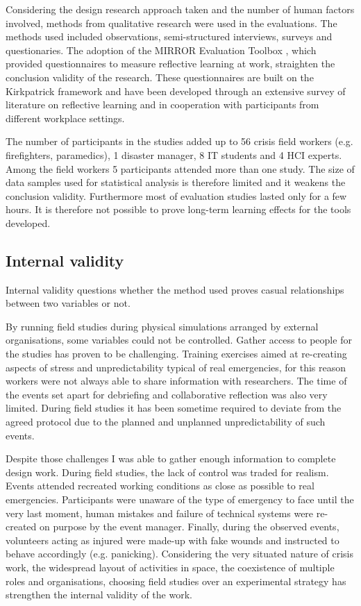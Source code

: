Considering the design research approach taken and the number of human factors involved, methods from qualitative research were used in the evaluations. The methods used included observations, semi-structured interviews, surveys and questionaries. The adoption of the MIRROR Evaluation Toolbox \autocite{Renner:v4nLmwOk}, which provided questionnaires to measure reflective learning at work, straighten the conclusion validity of the research. These questionnaires are built on the Kirkpatrick framework \autocite{kirkpatrick2009evaluating} and have been developed through an extensive survey of literature on reflective learning and in cooperation with participants from different workplace settings.

The number of participants in the studies added up to 56 crisis field workers (e.g. firefighters, paramedics), 1 disaster manager, 8 IT students and 4 HCI experts. Among the field workers 5 participants attended more than one study. The size of data samples used for statistical analysis is therefore limited and it weakens the conclusion validity. Furthermore most of evaluation studies lasted only for a few hours. It is therefore not possible to prove long-term learning effects for the tools developed.

\subsection{Internal validity}\label{internal-validity}

Internal validity questions whether the method used proves casual relationships between two variables or not.

By running field studies during physical simulations arranged by external organisations, some variables could not be controlled. Gather access to people for the studies has proven to be challenging. Training exercises aimed at re-creating aspects of stress and unpredictability typical of real emergencies, for this reason workers were not always able to share information with researchers. The time of the events set apart for debriefing and collaborative reflection was also very limited. During field studies it has been sometime required to deviate from the agreed protocol due to the planned and unplanned unpredictability of such events.

Despite those challenges I was able to gather enough information to complete  design work. During field studies, the lack of control was traded for realism. Events attended recreated working conditions as close as possible to real emergencies. Participants were unaware of the type of emergency to face until the very last moment, human mistakes and failure of technical systems were re-created on purpose by the event manager. Finally, during the observed events, volunteers acting as injured were made-up with fake wounds and instructed to behave accordingly (e.g. panicking). Considering the very situated nature of crisis work, the widespread layout of activities in space, the coexistence of multiple roles and organisations, choosing field studies over an experimental strategy has strengthen the internal validity of the work. 

